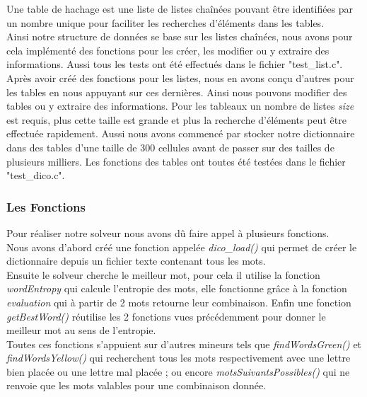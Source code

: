 Une table de hachage est une liste de listes chaînées pouvant être identifiées par un nombre unique pour faciliter les recherches d'éléments dans les tables. \\

Ainsi notre structure de données se base sur les listes chaînées, nous avons pour cela implémenté des fonctions pour les créer, les modifier ou y extraire des informations. Aussi tous les tests ont été effectués dans le fichier "test\_list.c". \\

Après avoir créé des fonctions pour les listes, nous en avons conçu d'autres pour les tables en nous appuyant sur ces dernières. Ainsi nous pouvons modifier des tables ou y extraire des informations. Pour les tableaux un nombre de listes \emph{size} est requis, plus cette taille est grande et plus la recherche d'éléments peut être effectuée rapidement. Aussi nous avons commencé par stocker notre dictionnaire dans des tables d'une taille de 300 cellules avant de passer sur des tailles de plusieurs milliers. 
Les fonctions des tables ont toutes été testées dans le fichier "test\_dico.c". \\

\subsubsection{Les Fonctions}
Pour réaliser notre solveur nous avons dû faire appel à plusieurs fonctions. \\
Nous avons d'abord créé une fonction appelée \emph{dico\_load()} qui permet de créer le dictionnaire depuis un fichier texte contenant tous les mots.\\
Ensuite le solveur cherche le meilleur mot, pour cela il utilise la fonction \emph{wordEntropy} qui calcule l'entropie des mots, elle fonctionne grâce à la fonction \emph{evaluation} qui à partir de 2 mots retourne leur combinaison. Enfin une fonction \emph{getBestWord()} réutilise les 2 fonctions vues précédemment pour donner le meilleur mot au sens de l'entropie. \\

Toutes ces fonctions s'appuient sur d'autres mineurs tels que \emph{findWordsGreen()} et \emph{findWordsYellow()} qui recherchent tous les mots respectivement avec une lettre bien placée ou une lettre mal placée ; ou encore \emph{motsSuivantsPossibles()} qui ne renvoie que les mots valables pour une combinaison donnée.\\

